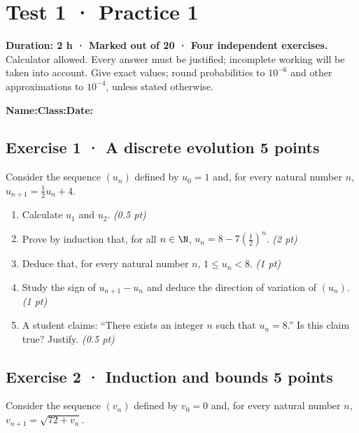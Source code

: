 \mxnewpage{}\label{sujet:1-1}

\section*{Test 1 · Practice 1}


\textbf{Duration: 2 h · Marked out of 20 · Four independent exercises.}\\Calculator allowed. Every answer must be justified; incomplete working will be taken into account. Give exact values; round probabilities to $10^{-6}$ and other approximations to $10^{-4}$, unless stated otherwise.

\smallskip\textbf{Name:}\enspace\dotfill\quad\textbf{Class:}\enspace\dotfill\quad\textbf{Date:}\enspace\dotfill

\subsection*{Exercise 1 · A discrete evolution \hfill 5 points}Consider the sequence $(u_n)$ defined by $u_0=1$ and, for every natural number $n$, $u_{n+1}=\frac{1}{2}u_n+4$.

\begin{enumerate}

\item Calculate $u_1$ and $u_2$. \hfill\textit{(0.5 pt)}

\item Prove by induction that, for all $n\in\N$, $u_n=8-7\left(\frac{1}{2}\right)^n$. \hfill\textit{(2 pt)}

\item Deduce that, for every natural number $n$, $1\le u_n<8$. \hfill\textit{(1 pt)}

\item Study the sign of $u_{n+1}-u_n$ and deduce the direction of variation of $(u_n)$. \hfill\textit{(1 pt)}

\item A student claims: ``There exists an integer $n$ such that $u_n=8$.'' Is this claim true? Justify. \hfill\textit{(0.5 pt)}

\end{enumerate}

\subsection*{Exercise 2 · Induction and bounds \hfill 5 points}Consider the sequence $(v_n)$ defined by $v_0=0$ and, for every natural number $n$, $v_{n+1}=\sqrt{72+v_n}$.

